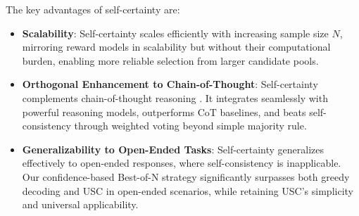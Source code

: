 The key advantages of self-certainty are:
\begin{itemize}[leftmargin=*, itemsep=0pt, topsep=0pt]  
\item \textbf{Scalability}: Self-certainty scales efficiently with increasing sample size \(N\), mirroring reward models in scalability but without their computational burden, enabling more reliable selection from larger candidate pools.
\item \textbf{Orthogonal Enhancement to Chain-of-Thought}:  Self-certainty complements chain-of-thought reasoning \cite{wei2022chain}. It integrates seamlessly with powerful reasoning models, outperforms CoT baselines, and beats self-consistency through weighted voting beyond simple majority rule.
\item \textbf{Generalizability to Open-Ended Tasks}: Self-certainty generalizes effectively to open-ended responses, where self-consistency is inapplicable. Our confidence-based Best-of-N strategy significantly surpasses both greedy decoding and USC in open-ended scenarios, while retaining USC’s simplicity and universal applicability.
\end{itemize}
